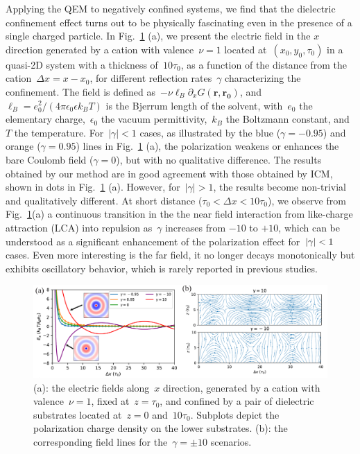 Applying the QEM to negatively confined systems, we find that the dielectric confinement effect turns out to be physically fascinating even in the presence of a single charged particle. 
In Fig.~\ref{fig:force_x} (a), we present the electric field in the $x$ direction generated by a cation with valence~$\nu=1$ located at~$(x_0, y_0, \tau_0)$ in a quasi-2D system with a thickness of~$10\tau_0$, as a function of the distance from the cation~$\Delta x=x-x_0$, for different reflection rates~$\gamma$ characterizing the confinement. 
The field is defined as~$-\nu\ell_B\partial_x G(\mathbf{r}, \mathbf{r_0})$, and~$\ell_B=e_0^2/(4\pi\epsilon_0\epsilon k_B T)$ is the Bjerrum length of the solvent, with~$e_0$ the elementary charge,~$\epsilon_0$ the vacuum permittivity,~$k_B$ the Boltzmann constant, and~$T$ the temperature. 
For~$\vert\gamma\vert<1$ cases, as illustrated by the blue ($\gamma=-0.95$) and orange ($\gamma=0.95$) lines in Fig.~\ref{fig:force_x} (a), the polarization weakens or enhances the bare Coulomb field ($\gamma=0$), but with no qualitative difference. 
The results obtained by our method are in good agreement with those obtained by ICM, shown in dots in Fig.~\ref{fig:force_x} (a). 
However, for~$\vert\gamma\vert>1$, the results become non-trivial and qualitatively different. 
At short distance ($\tau_0<\Delta x < 10\tau_0$), we observe from Fig.~\ref{fig:force_x}(a) a continuous transition in the the near field interaction from like-charge attraction (LCA) into repulsion as~$\gamma$ increases from $-10$ to $+10$,
which can be understood as a significant enhancement of the polarization effect for~$\lvert\gamma\rvert<1$ cases.
Even more interesting is the far field, it no longer decays monotonically but exhibits oscillatory behavior, which is rarely reported in previous studies.

\begin{figure}[htbp]
	\centering
	\includegraphics[width=1\textwidth]{figs/fig2.pdf}
	\caption{(a): the electric fields along~$x$ direction, generated by a cation with valence~$\nu=1$, fixed at~$z=\tau_0$, and confined by a pair of dielectric substrates located at~$z=0$ and~$10\tau_0$. Subplots depict the polarization charge density on the lower substrates. 
    (b): the corresponding field lines for the~$\gamma=\pm10$ scenarios.}
    \label{fig:force_x}
\end{figure}

